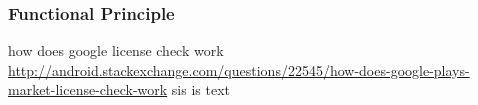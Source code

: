 \subsubsection{Functional Principle}\label{subsection:lvl-google-functional}
how does google license check work \url{http://android.stackexchange.com/questions/22545/how-does-google-plays-market-license-check-work}\newline
sis is text
